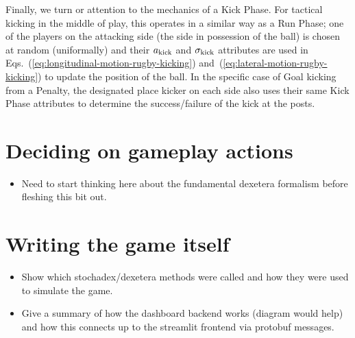 Finally, we turn or attention to the mechanics of a {\sf Kick Phase}. For tactical kicking in the middle of play, this operates in a similar way as a {\sf Run Phase}; one of the players on the attacking side (the side in possession of the ball) is chosen at random (uniformally) and their $a_{\rm kick}$ and $\sigma_{\rm kick}$ attributes are used in Eqs.~(\ref{eq:longitudinal-motion-rugby-kicking}) and~(\ref{eq:lateral-motion-rugby-kicking}) to update the position of the ball. In the specific case of {\sf Goal} kicking from a {\sf Penalty}, the designated place kicker on each side also uses their same {\sf Kick Phase} attributes to determine the success/failure of the kick at the posts.

\section{\sffamily Deciding on gameplay actions}

\begin{itemize}
\item{Need to start thinking here about the fundamental dexetera formalism before fleshing this bit out.}
\end{itemize}

\section{\sffamily Writing the game itself}

\begin{itemize}
\item{Show which stochadex/dexetera methods were called and how they were used to simulate the game.}
\item{Give a summary of how the dashboard backend works (diagram would help) and how this connects up to the streamlit frontend via protobuf messages.}
\end{itemize}